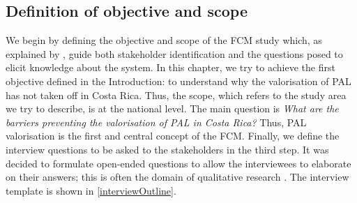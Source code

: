 \begin{table}[H]
\centering
{}
\end{table}


\subsection{Definition of objective and scope}

We begin by defining the objective and scope of the FCM study which, as explained by \cite{edwards2021building}, guide both stakeholder identification and the questions posed to elicit knowledge about the system. In this chapter, we try to achieve the first objective defined in the Introduction: to understand why the valorisation of PAL has not taken off in Costa Rica. Thus, the scope, which refers to the study area we try to describe, is at the national level. The main question is \textit{What are the barriers preventing the valorisation of PAL in Costa Rica?} Thus, PAL valorisation is the first and central concept of the FCM. Finally, we define the interview questions to be asked to the stakeholders in the third step. It was decided to formulate open-ended questions to allow the interviewees to elaborate on their answers; this is often the domain of qualitative research \citep{barbrook2022systems}. The interview template is shown in \cref{interviewOutline}.
  

